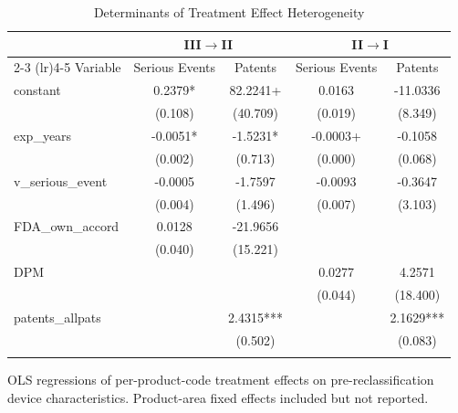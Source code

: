 \begin{table}[htbp]
\centering
\caption{Determinants of Treatment Effect Heterogeneity}
\label{tab:reg_design}
\begin{tabular}{lcccc}
\toprule
& \multicolumn{2}{c}{III$\to$II} & \multicolumn{2}{c}{II$\to$I} \\
\cmidrule(lr){2-3} \cmidrule(lr){4-5}
Variable & Serious Events & Patents & Serious Events & Patents \\
\midrule
constant & 0.2379* & 82.2241+ & 0.0163 & -11.0336 \\
 & (0.108) & (40.709) & (0.019) & (8.349) \\
\addlinespace
exp\_years & -0.0051* & -1.5231* & -0.0003+ & -0.1058 \\
 & (0.002) & (0.713) & (0.000) & (0.068) \\
\addlinespace
v\_serious\_event & -0.0005 & -1.7597 & -0.0093 & -0.3647 \\
 & (0.004) & (1.496) & (0.007) & (3.103) \\
\addlinespace
FDA\_own\_accord & 0.0128 & -21.9656 &  &  \\
 & (0.040) & (15.221) &  &  \\
\addlinespace
DPM &  &  & 0.0277 & 4.2571 \\
 &  &  & (0.044) & (18.400) \\
\addlinespace
patents\_allpats &  & 2.4315*** &  & 2.1629*** \\
 &  & (0.502) &  & (0.083) \\
\addlinespace
\bottomrule
\end{tabular}
\begin{tablenotes}\small
\item OLS regressions of per-product-code treatment effects on pre-reclassification device characteristics. Product-area fixed effects included but not reported.
\end{tablenotes}
\end{table}